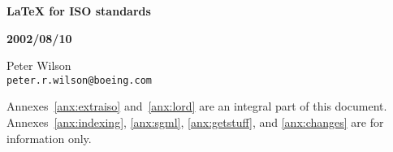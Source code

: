 \documentclass[wd,letterpaper,copyright]{isov2}
\begin{document}
\begin{cover}
\vspace*{4in}
\begin{center}
\Huge\bfseries LaTeX for ISO standards
\end{center}
\begin{center}
\bfseries 2002/08/10
\end{center}
\begin{center}
Peter Wilson \\
\texttt{peter.r.wilson@boeing.com}
\end{center}
\clearpage
\end{cover}

\begin{foreword}
\fwdbp
\fwdnopatents
Annexes~\ref{anx:extraiso} and~\ref{anx:lord}
are an integral part of this document.
Annexes~\ref{anx:indexing}, \ref{anx:sgml}, \ref{anx:getstuff},
and \ref{anx:changes}
are for information only.
\end{foreword}
\end{document}
